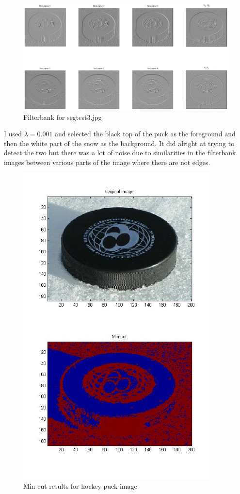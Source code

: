 \documentclass[11pt,psfig]{article}
\begin{document}
\begin{figure}[H]
\centering
\includegraphics[width=6in]{prob5plotB_3_filter.jpg}
\caption{Filterbank for segtest3.jpg}
\end{figure}

I used $\lambda=0.001$ and selected the black top of the puck as the foreground and then the white part of the snow as the background. It did alright at trying to detect the two but there was a lot of noise due to similarities in the filterbank images between various parts of the image where there are not edges. 

\begin{figure}[H]
\centering
\includegraphics[width=4in]{prob5plotB_3.jpg}
\caption{Min cut results for hockey puck image}
\end{figure}
\end{document}

